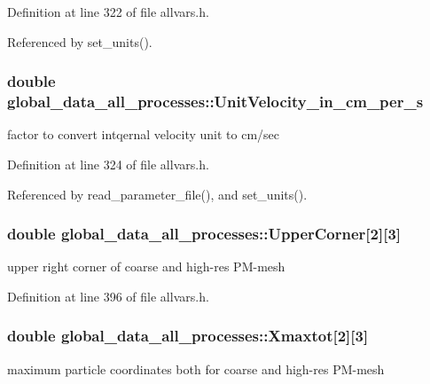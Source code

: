 Definition at line 322 of file allvars.h.



Referenced by set\_\-units().

\hypertarget{structglobal__data__all__processes_a04f4a1972c99f3ab4ba2483237a9d8ab}{
\subsubsection[{UnitVelocity\_\-in\_\-cm\_\-per\_\-s}]{\setlength{\rightskip}{0pt plus 5cm}double {\bf global\_\-data\_\-all\_\-processes::UnitVelocity\_\-in\_\-cm\_\-per\_\-s}}}
\label{structglobal__data__all__processes_a04f4a1972c99f3ab4ba2483237a9d8ab}
factor to convert intqernal velocity unit to cm/sec 

Definition at line 324 of file allvars.h.



Referenced by read\_\-parameter\_\-file(), and set\_\-units().

\hypertarget{structglobal__data__all__processes_a2a0fb0d1cda3309f002d1c0984209111}{
\subsubsection[{UpperCorner}]{\setlength{\rightskip}{0pt plus 5cm}double {\bf global\_\-data\_\-all\_\-processes::UpperCorner}\mbox{[}2\mbox{]}\mbox{[}3\mbox{]}}}
\label{structglobal__data__all__processes_a2a0fb0d1cda3309f002d1c0984209111}
upper right corner of coarse and high-\/res PM-\/mesh 

Definition at line 396 of file allvars.h.

\hypertarget{structglobal__data__all__processes_a3818f3c9b2979834f6938c7f18b39b0e}{
\subsubsection[{Xmaxtot}]{\setlength{\rightskip}{0pt plus 5cm}double {\bf global\_\-data\_\-all\_\-processes::Xmaxtot}\mbox{[}2\mbox{]}\mbox{[}3\mbox{]}}}
\label{structglobal__data__all__processes_a3818f3c9b2979834f6938c7f18b39b0e}
maximum particle coordinates both for coarse and high-\/res PM-\/mesh 

